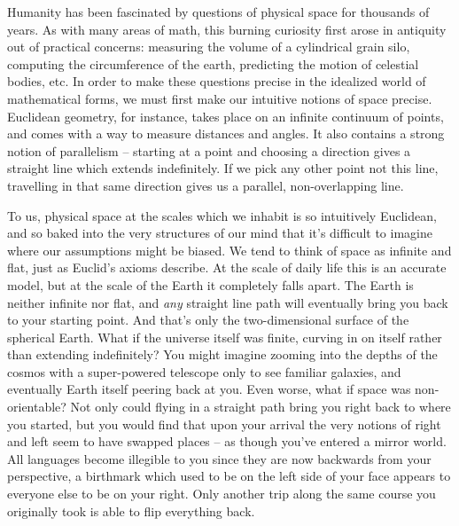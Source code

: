 Humanity has been fascinated by questions of physical space for thousands of years. As with many areas of math, this burning curiosity first arose in antiquity out of practical concerns: measuring the volume of a cylindrical grain silo, computing the circumference of the earth, predicting the motion of celestial bodies, etc. In order to make these questions precise in the idealized world of mathematical forms, we must first make our intuitive notions of space precise. 
Euclidean geometry, for instance, takes place on an infinite continuum of points, and comes with a way to measure distances and angles. It also contains a strong notion of parallelism -- starting at a point and choosing a direction gives a straight line which extends indefinitely. If we pick any other point not this line, travelling in that same direction gives us a parallel, non-overlapping line.

To us, physical space at the scales which we inhabit is so intuitively Euclidean, and so baked into the very structures of our mind that it's difficult to imagine where our assumptions might be biased. We tend to think of space as infinite and flat, just as Euclid's axioms describe. At the scale of daily life this is an accurate model, but at the scale of the Earth it completely falls apart. The Earth is neither infinite nor flat, and \emph{any} straight line path will eventually bring you back to your starting point. 
And that's only the two-dimensional surface of the spherical Earth. What if the universe itself was finite, curving in on itself rather than extending indefinitely? You might imagine zooming into the depths of the cosmos with a super-powered telescope only to see familiar galaxies, and eventually Earth itself peering back at you.
Even worse, what if space was non-orientable? Not only could flying in a straight path bring you right back to where you started, but you would find that upon your arrival the very notions of right and left seem to have swapped places -- as though you've entered a mirror world. All languages become illegible to you since they are now backwards from your perspective, a birthmark which used to be on the left side of your face appears to everyone else to be on your right. Only another trip along the same course you originally took is able to flip everything back.

